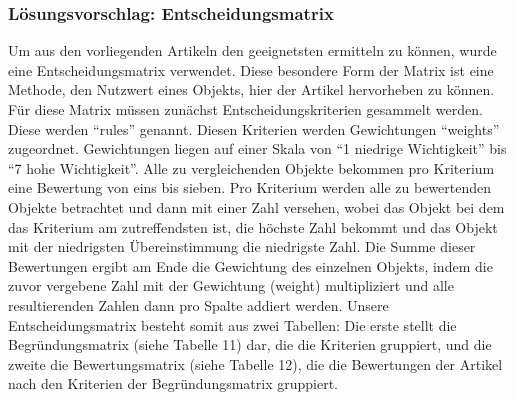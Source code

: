 \subsubsection{Lösungsvorschlag: Entscheidungsmatrix}

Um aus den vorliegenden Artikeln den geeignetsten ermitteln zu können, wurde eine Entscheidungsmatrix verwendet. 
Diese besondere Form der Matrix ist eine Methode, den Nutzwert eines Objekts, hier der Artikel hervorheben zu können.
Für diese Matrix müssen zunächst Entscheidungskriterien gesammelt werden. 
Diese werden ``rules'' genannt. 
Diesen Kriterien werden Gewichtungen ``weights'' zugeordnet. 
Gewichtungen liegen auf einer Skala von ``1 niedrige Wichtigkeit'' bis ``7 hohe Wichtigkeit''. 
Alle zu vergleichenden Objekte bekommen pro Kriterium eine Bewertung von eins bis sieben. 
Pro Kriterium werden alle zu bewertenden Objekte betrachtet und dann mit einer Zahl versehen, wobei das Objekt bei dem das Kriterium am zutreffendsten ist, die höchste Zahl bekommt und das Objekt mit der niedrigsten Übereinstimmung die niedrigste Zahl. 
Die Summe dieser Bewertungen ergibt am Ende die Gewichtung des einzelnen Objekts, indem die zuvor vergebene Zahl mit der Gewichtung (weight) multipliziert und alle resultierenden Zahlen dann pro Spalte addiert werden. 
Unsere Entscheidungsmatrix besteht somit aus zwei Tabellen: 
Die erste stellt die Begründungsmatrix (siehe Tabelle 11) dar, die die Kriterien gruppiert, und die zweite die Bewertungsmatrix (siehe Tabelle 12), die die Bewertungen der Artikel nach den Kriterien der Begründungsmatrix gruppiert.



